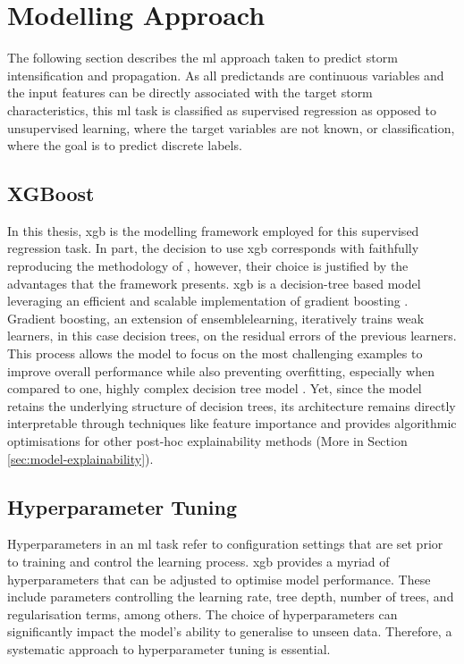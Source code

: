\section{Modelling Approach}

The following section describes the \acrfull{ml} approach taken to predict storm intensification and propagation. As all predictands are continuous variables and the input features can be directly associated with the target storm characteristics, this \acrshort{ml} task is classified as supervised regression as opposed to unsupervised learning, where the target variables are not known, or classification, where the goal is to predict discrete labels.

\subsection{XGBoost}

In this thesis, \acrfull{xgb} is the modelling framework employed for this supervised regression task. In part, the decision to use \acrshort{xgb} corresponds with faithfully reproducing the methodology of \cite{Hunt2024}, however, their choice is justified by the advantages that the framework presents. \acrshort{xgb} is a decision-tree based model leveraging an efficient and scalable implementation of gradient boosting \citep{Chen2016}. Gradient boosting, an extension of \gls{ensemblelearning}, iteratively trains weak learners, in this case decision trees, on the residual errors of the previous learners. This process allows the model to focus on the most challenging examples to improve overall performance while also preventing overfitting, especially when compared to one, highly complex decision tree model \citep{Friedman2001}. Yet, since the model retains the underlying structure of decision trees, its architecture remains directly interpretable through techniques like feature importance and provides algorithmic optimisations for other post-hoc explainability methods \citep{Lundberg2019} (More in Section \ref{sec:model-explainability}).

\subsection{Hyperparameter Tuning}

Hyperparameters in an \acrshort{ml} task refer to configuration settings that are set prior to training and control the learning process. \acrshort{xgb} provides a myriad of hyperparameters that can be adjusted to optimise model performance. These include parameters controlling the learning rate, tree depth, number of trees, and regularisation terms, among others. The choice of hyperparameters can significantly impact the model's ability to generalise to unseen data. Therefore, a systematic approach to hyperparameter tuning is essential. 

